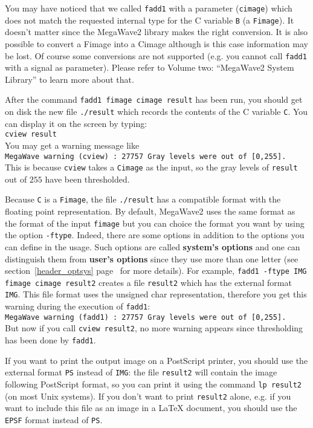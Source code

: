 You may have noticed that we called \verb+fadd1+ with a parameter (\verb+cimage+) which does not match the requested internal type for the C variable \verb+B+ (a \verb+Fimage+).
It doesn't matter since the MegaWave2 library makes the right conversion.
It is also possible to convert a Fimage into a Cimage although is this case information may
be lost.
Of course some conversions are not supported (e.g. you cannot call \verb+fadd1+ with a signal as parameter).
Please refer to Volume two: ``MegaWave2 System Library'' to learn more about that.

After the command \verb+fadd1 fimage cimage result+ has been run, you should get on disk
the new file \verb+./result+ which records the contents of the C variable \verb+C+.
You can display it on the screen by typing: \\
\verb+cview result+\\
You may get a warning message like \\
\verb+MegaWave warning (cview) : 27757 Gray levels were out of [0,255].+\\
This is because \verb+cview+ takes a \verb+Cimage+ as the input, so the gray levels of
\verb+result+ out of $255$ have been thresholded.

Because \verb+C+ is a \verb+Fimage+, the file \verb+./result+ has a compatible format 
with the floating point representation.
By default, MegaWave2 uses the same format as the format of the input \verb+fimage+
but you can choice the format you want by using the option \verb+-ftype+.
Indeed, there are some options in addition to the options you can define in the usage.
Such options are called {\bf system's options} and one can distinguish them from
{\bf user's options} since they use more than one letter
(see section~\ref{header_optsys} page~\pageref{header_optsys} for more details).
For example, \verb+fadd1 -ftype IMG fimage cimage result2+ creates a file
\verb+result2+ which has the external format \verb+IMG+.
This file format uses the unsigned char representation, therefore you get this warning
during the execution of \verb+fadd1+: \\
\verb+MegaWave warning (fadd1) : 27757 Gray levels were out of [0,255].+\\
But now if you call \verb+cview result2+, no more warning appears since thresholding has
been done by \verb+fadd1+.

If you want to print the output image on a PostScript printer, you should use
the external format \verb+PS+ instead of \verb+IMG+: the file \verb+result2+
will contain the image following PostScript format, so you can print it 
using the command \verb+lp result2+ (on most Unix systems). 
If you don't want to print \verb+result2+ alone, e.g. if you want to include this
file as an image in a \LaTeX{} document, you should use the \verb+EPSF+ format 
instead of \verb+PS+.

